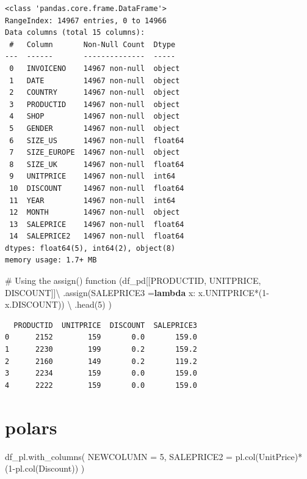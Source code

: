\documentclass[
  letterpaper,
  DIV=11,
  numbers=noendperiod]{scrreprt}
\newenvironment{Shaded}{\begin{snugshade}}{\end{snugshade}}
\newcommand{\CommentTok}[1]{\textcolor[rgb]{0.37,0.37,0.37}{#1}}
\newcommand{\DecValTok}[1]{\textcolor[rgb]{0.68,0.00,0.00}{#1}}
\newcommand{\KeywordTok}[1]{\textcolor[rgb]{0.00,0.23,0.31}{\textbf{#1}}}
\newcommand{\NormalTok}[1]{\textcolor[rgb]{0.00,0.23,0.31}{#1}}
\newcommand{\OperatorTok}[1]{\textcolor[rgb]{0.37,0.37,0.37}{#1}}
\newcommand{\StringTok}[1]{\textcolor[rgb]{0.13,0.47,0.30}{#1}}
\begin{document}
\begin{verbatim}
<class 'pandas.core.frame.DataFrame'>
RangeIndex: 14967 entries, 0 to 14966
Data columns (total 15 columns):
 #   Column       Non-Null Count  Dtype  
---  ------       --------------  -----  
 0   INVOICENO    14967 non-null  object 
 1   DATE         14967 non-null  object 
 2   COUNTRY      14967 non-null  object 
 3   PRODUCTID    14967 non-null  object 
 4   SHOP         14967 non-null  object 
 5   GENDER       14967 non-null  object 
 6   SIZE_US      14967 non-null  float64
 7   SIZE_EUROPE  14967 non-null  object 
 8   SIZE_UK      14967 non-null  float64
 9   UNITPRICE    14967 non-null  int64  
 10  DISCOUNT     14967 non-null  float64
 11  YEAR         14967 non-null  int64  
 12  MONTH        14967 non-null  object 
 13  SALEPRICE    14967 non-null  float64
 14  SALEPRICE2   14967 non-null  float64
dtypes: float64(5), int64(2), object(8)
memory usage: 1.7+ MB
\end{verbatim}

\begin{Shaded}
\begin{Highlighting}[]
\CommentTok{\# Using the assign() function}
\NormalTok{(df\_pd[[}\StringTok{\textquotesingle{}PRODUCTID\textquotesingle{}}\NormalTok{, }\StringTok{\textquotesingle{}UNITPRICE\textquotesingle{}}\NormalTok{, }\StringTok{\textquotesingle{}DISCOUNT\textquotesingle{}}\NormalTok{]]}\OperatorTok{\textbackslash{}}
\NormalTok{    .assign(SALEPRICE3 }\OperatorTok{=}\KeywordTok{lambda}\NormalTok{ x: x.UNITPRICE}\OperatorTok{*}\NormalTok{(}\DecValTok{1}\OperatorTok{{-}}\NormalTok{x.DISCOUNT)) }\OperatorTok{\textbackslash{}}
\NormalTok{    .head(}\DecValTok{5}\NormalTok{)}
\NormalTok{)}
\end{Highlighting}
\end{Shaded}

\begin{verbatim}
  PRODUCTID  UNITPRICE  DISCOUNT  SALEPRICE3
0      2152        159       0.0       159.0
1      2230        199       0.2       159.2
2      2160        149       0.2       119.2
3      2234        159       0.0       159.0
4      2222        159       0.0       159.0
\end{verbatim}

\section{polars}

\begin{Shaded}
\begin{Highlighting}[]
\NormalTok{df\_pl.with\_columns(}
\NormalTok{    NEWCOLUMN }\OperatorTok{=} \DecValTok{5}\NormalTok{,}
\NormalTok{    SALEPRICE2 }\OperatorTok{=}\NormalTok{ pl.col(}\StringTok{\textquotesingle{}UnitPrice\textquotesingle{}}\NormalTok{)}\OperatorTok{*}\NormalTok{(}\DecValTok{1}\OperatorTok{{-}}\NormalTok{pl.col(}\StringTok{\textquotesingle{}Discount\textquotesingle{}}\NormalTok{))}
\NormalTok{)}
\end{Highlighting}
\end{Shaded}
\end{document}
